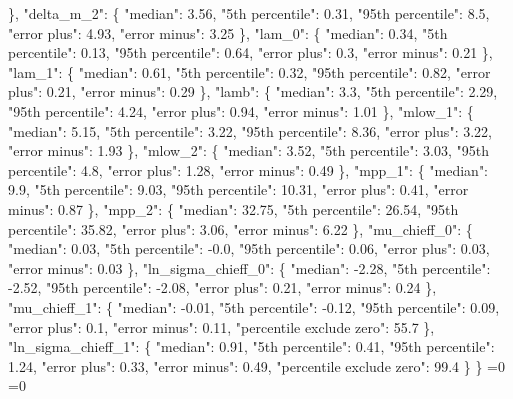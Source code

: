 {{      \}, %
      "delta\_m\_2": \{%
        "median": 3.56, %
        "5th percentile": 0.31, %
        "95th percentile": 8.5, %
        "error plus": 4.93, %
        "error minus": 3.25%
      \}, %
      "lam\_0": \{%
        "median": 0.34, %
        "5th percentile": 0.13, %
        "95th percentile": 0.64, %
        "error plus": 0.3, %
        "error minus": 0.21%
      \}, %
      "lam\_1": \{%
        "median": 0.61, %
        "5th percentile": 0.32, %
        "95th percentile": 0.82, %
        "error plus": 0.21, %
        "error minus": 0.29%
      \}, %
      "lamb": \{%
        "median": 3.3, %
        "5th percentile": 2.29, %
        "95th percentile": 4.24, %
        "error plus": 0.94, %
        "error minus": 1.01%
      \}, %
      "mlow\_1": \{%
        "median": 5.15, %
        "5th percentile": 3.22, %
        "95th percentile": 8.36, %
        "error plus": 3.22, %
        "error minus": 1.93%
      \}, %
      "mlow\_2": \{%
        "median": 3.52, %
        "5th percentile": 3.03, %
        "95th percentile": 4.8, %
        "error plus": 1.28, %
        "error minus": 0.49%
      \}, %
      "mpp\_1": \{%
        "median": 9.9, %
        "5th percentile": 9.03, %
        "95th percentile": 10.31, %
        "error plus": 0.41, %
        "error minus": 0.87%
      \}, %
      "mpp\_2": \{%
        "median": 32.75, %
        "5th percentile": 26.54, %
        "95th percentile": 35.82, %
        "error plus": 3.06, %
        "error minus": 6.22%
      \}, %
      "mu\_chieff\_0": \{%
        "median": 0.03, %
        "5th percentile": {-}0.0, %
        "95th percentile": 0.06, %
        "error plus": 0.03, %
        "error minus": 0.03%
      \}, %
      "ln\_sigma\_chieff\_0": \{%
        "median": {-}2.28, %
        "5th percentile": {-}2.52, %
        "95th percentile": {-}2.08, %
        "error plus": 0.21, %
        "error minus": 0.24%
      \}, %
      "mu\_chieff\_1": \{%
        "median": {-}0.01, %
        "5th percentile": {-}0.12, %
        "95th percentile": 0.09, %
        "error plus": 0.1, %
        "error minus": 0.11, %
        "percentile exclude zero": 55.7%
      \}, %
      "ln\_sigma\_chieff\_1": \{%
        "median": 0.91, %
        "5th percentile": 0.41, %
        "95th percentile": 1.24, %
        "error plus": 0.33, %
        "error minus": 0.49, %
        "percentile exclude zero": 99.4%
      \}%
    \}}%
  \else%
    \ifnum{}=0%
      \let\zchieffLinearCorrelationModel@I@out\zchieffLinearCorrelationModel@III%
    \else%
      \ifnum{}=0%
      \let\zchieffLinearCorrelationModel@I@out\zchieffLinearCorrelationModel@IV%
}
